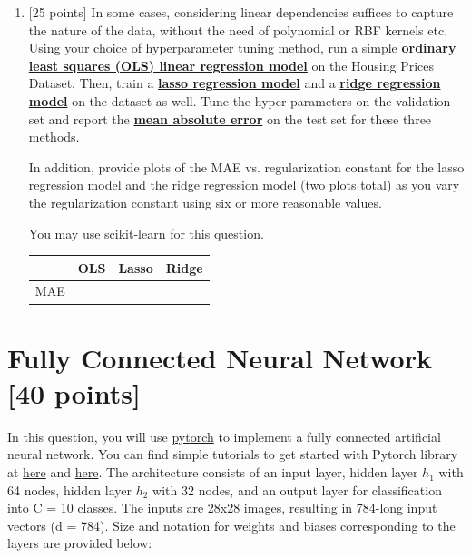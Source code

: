 \documentclass[letterpaper]{article}
\begin{document}
\begin{enumerate}
    \item {[25 points]} In some cases, considering linear dependencies suffices to capture the nature of the data, without the need of polynomial or RBF kernels etc. Using your choice of hyperparameter tuning method, run a simple \href{https://scikit-learn.org/stable/modules/generated/sklearn.linear_model.LinearRegression.html#sklearn-linear-model-linearregression}{\textbf{ordinary least squares (OLS) linear regression model}} on the Housing Prices Dataset. Then, train a \href{https://scikit-learn.org/stable/modules/generated/sklearn.linear_model.Lasso.html#sklearn-linear-model-lasso}{\textbf{lasso regression model}} and a \href{https://scikit-learn.org/stable/modules/generated/sklearn.linear_model.Ridge.html#sklearn-linear-model-ridge}{\textbf{ridge regression model}} on the dataset as well. Tune the hyper-parameters on the validation set and report the \href{https://scikit-learn.org/stable/modules/generated/sklearn.metrics.mean_absolute_error.html#sklearn-metrics-mean-absolute-error}{\textbf{mean absolute error}} on the test set for these three methods. 
    
    In addition, provide plots of the MAE vs. regularization constant for the lasso regression model and the ridge regression model (two plots total) as you vary the regularization constant using six or more reasonable values.
    
    You may use \underline{scikit-learn} for this question.
    \begin{table}[h!]
    \center
    \begin{tabular}{|l|c|c|c|}\hline
        & OLS         & Lasso       & Ridge    \\\hline
    MAE &             &             &          \\\hline
    \end{tabular}
    \end{table}
  
\end{enumerate}


\section{Fully Connected Neural Network [40 points]}
\label{sec:FC}

In this question, you will use \underline{pytorch} to implement a fully connected artificial neural network. You can find simple tutorials to get started with Pytorch library at \href{https://pytorch.org/tutorials/beginner/deep_learning_60min_blitz.html}{here} and \href{https://medium.com/biaslyai/pytorch-introduction-to-neural-network-feedforward-neural-network-model-e7231cff47cb}{here}. The architecture consists of an input layer, hidden layer $h_{1}$ with 64 nodes, hidden layer $h_{2}$ with 32 nodes, and an output layer for classification into C = 10 classes. The inputs are 28x28 images, resulting in 784-long input vectors (d = 784). Size and notation for weights and biases corresponding to the layers are provided below:
\end{document}

